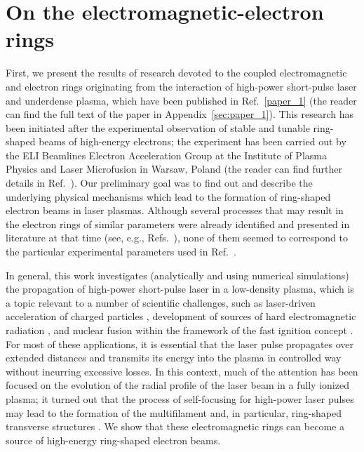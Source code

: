 \documentclass[10pt, a4paper, twoside, openright]{report}
\begin{document}
\section{On the electromagnetic-electron rings\label{sec:on_the_electromagnetic-electron_rings}}
%

First, we present the results of research devoted to the coupled electromagnetic and electron rings originating from the interaction of high-power short-pulse laser and underdense plasma, which have been published in Ref.~\ref{paper_1} (the reader can find the full text of the paper in Appendix~\ref{sec:paper_1}). This research has been initiated after the experimental observation of stable and tunable ring-shaped beams of high-energy electrons; the experiment has been carried out by the ELI Beamlines Electron Acceleration Group at the Institute of Plasma Physics and Laser Microfusion in Warsaw, Poland (the reader can find further details in Ref.~). Our preliminary goal was to find out and describe the underlying physical mechanisms which lead to the formation of ring-shaped electron beams in laser plasmas. Although several processes that may result in the electron rings of similar parameters were already identified and presented in literature at that time (see, e.g., Refs.~), none of them seemed to correspond to the particular experimental parameters used in Ref.~.

In general, this work investigates (analytically and using numerical simulations) the propagation of high-power short-pulse laser in a low-density plasma, which is a topic relevant to a number of scientific challenges, such as laser-driven acceleration of charged particles \cite{Tajima1979, Esarey2009, Gonsalves2019}, development of sources of hard electromagnetic radiation \cite{Pirozhkov2012, Bulanov2013}, and nuclear fusion within the framework of the fast ignition concept \cite{Tabak1994}. For most of these applications, it is essential that the laser pulse propagates over extended distances and transmits its energy into the plasma in controlled way without incurring excessive losses. In this context, much of the attention has been focused on the evolution of the radial profile of the laser beam in a fully ionized plasma; it turned out that the process of self-focusing for high-power laser pulses may lead to the formation of the multifilament and, in particular, ring-shaped transverse structures \cite{Mori1988, Cohen1991, Borisov1992, Krushelnick1997, Cattani2001, Kim2002, Naseri2016, Kovalev2019}. We show that these electromagnetic rings can become a source of high-energy ring-shaped electron beams. 
\end{document}
